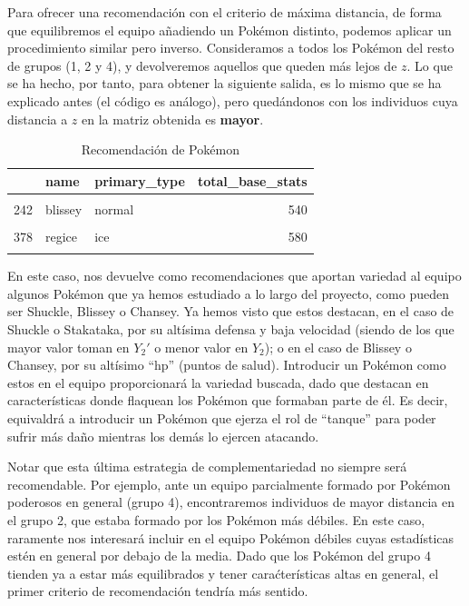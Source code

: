 \documentclass[
  11.8pt,
]{extreport}
\begin{document}
Para ofrecer una recomendación con el criterio de máxima distancia, de
forma que equilibremos el equipo añadiendo un Pokémon distinto, podemos
aplicar un procedimiento similar pero inverso. Consideramos a todos los
Pokémon del resto de grupos (1, 2 y 4), y devolveremos aquellos que
queden más lejos de \(z\). Lo que se ha hecho, por tanto, para obtener
la siguiente salida, es lo mismo que se ha explicado antes (el código es
análogo), pero quedándonos con los individuos cuya distancia a \(z\) en
la matriz obtenida es \textbf{mayor}.

\begin{table}[H]
\centering
\caption{Recomendación de Pokémon}
\centering
\begin{tabular}[t]{lllr}
\toprule
  & name & primary\_type & total\_base\_stats\\
\midrule
\cellcolor{gray!10}{213} & \cellcolor{gray!10}{shuckle} & \cellcolor{gray!10}{bug} & \cellcolor{gray!10}{505}\\
242 & blissey & normal & 540\\
\cellcolor{gray!10}{113} & \cellcolor{gray!10}{chansey} & \cellcolor{gray!10}{normal} & \cellcolor{gray!10}{450}\\
378 & regice & ice & 580\\
\cellcolor{gray!10}{805} & \cellcolor{gray!10}{stakataka} & \cellcolor{gray!10}{rock} & \cellcolor{gray!10}{570}\\
\bottomrule
\end{tabular}
\end{table}

En este caso, nos devuelve como recomendaciones que aportan variedad al
equipo algunos Pokémon que ya hemos estudiado a lo largo del proyecto,
como pueden ser Shuckle, Blissey o Chansey. Ya hemos visto que estos
destacan, en el caso de Shuckle o Stakataka, por su altísima defensa y
baja velocidad (siendo de los que mayor valor toman en \(Y_2'\) o menor
valor en \(Y_2\)); o en el caso de Blissey o Chansey, por su altísimo
``hp'' (puntos de salud). Introducir un Pokémon como estos en el equipo
proporcionará la variedad buscada, dado que destacan en características
donde flaquean los Pokémon que formaban parte de él. Es decir,
equivaldrá a introducir un Pokémon que ejerza el rol de ``tanque'' para
poder sufrir más daño mientras los demás lo ejercen atacando.

Notar que esta última estrategia de complementariedad no siempre será
recomendable. Por ejemplo, ante un equipo parcialmente formado por
Pokémon poderosos en general (grupo 4), encontraremos individuos de
mayor distancia en el grupo 2, que estaba formado por los Pokémon más
débiles. En este caso, raramente nos interesará incluir en el equipo
Pokémon débiles cuyas estadísticas estén en general por debajo de la
media. Dado que los Pokémon del grupo 4 tienden ya a estar más
equilibrados y tener caraćterísticas altas en general, el primer
criterio de recomendación tendría más sentido.
\end{document}
